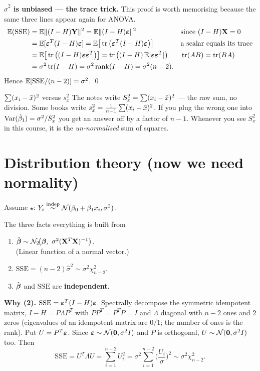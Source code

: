 \documentclass[11pt]{article}
\begin{document}
\textbf{$\hat\sigma^2$ is unbiased --- the trace trick.} This proof is worth memorising
because the same three lines appear again for ANOVA.
\begin{align*}
  \mathbb{E}(\mathrm{SSE}) &= \mathbb{E}\|(I-H)\mathbf{Y}\|^2 = \mathbb{E}\|(I-H)\boldsymbol{\varepsilon}\|^2 && \text{since } (I-H)\mathbf{X}=0\\
  &= \mathbb{E}[\boldsymbol{\varepsilon}^T(I-H)\boldsymbol{\varepsilon}] = \mathbb{E}\big[\operatorname{tr}\big(\boldsymbol{\varepsilon}^T(I-H)\boldsymbol{\varepsilon}\big)\big] && \text{a scalar equals its trace}\\
  &= \mathbb{E}\big[\operatorname{tr}\big((I-H)\boldsymbol{\varepsilon}\boldsymbol{\varepsilon}^T\big)\big] = \operatorname{tr}\big((I-H)\,\mathbb{E}[\boldsymbol{\varepsilon}\boldsymbol{\varepsilon}^T]\big) && \operatorname{tr}(AB)=\operatorname{tr}(BA)\\
  &= \sigma^2\operatorname{tr}(I-H) = \sigma^2\operatorname{rank}(I-H) = \sigma^2(n-2).
\end{align*}
Hence $\mathbb{E}[\mathrm{SSE}/(n-2)]=\sigma^2$. \qed

\begin{confusion}{$\sum(x_i-\bar{x})^2$ versus $s_x^2$}
The notes write $S_x^2=\sum(x_i-\bar{x})^2$ --- the raw sum, no division. Some books write
$s_x^2 = \frac1{n-1}\sum(x_i-\bar{x})^2$. If you plug the wrong one into
$\operatorname{Var}(\hat\beta_1)=\sigma^2/S_x^2$ you get an answer off by a factor of $n-1$. Whenever you
see $S_x^2$ in this course, it is the \emph{un-normalised} sum of squares.
\end{confusion}

\section{Distribution theory (now we need normality)}

Assume $\star$: $Y_i \overset{\text{indep}}{\sim} \mathcal{N}(\beta_0+\beta_1x_i,\sigma^2)$.

\begin{idea}{The three facts everything is built from}
\begin{enumerate}
  \item $\hat\bb \sim \N_2\!\big(\bb,\ \sigma^2(\bX^T\bX)^{-1}\big)$. \\
        (Linear function of a normal vector.)
  \item $\mathrm{SSE}=(n-2)\hat\sigma^2 \sim \sigma^2\chi^2_{n-2}$.
  \item $\hat{\boldsymbol{\beta}}$ and $\mathrm{SSE}$ are \textbf{independent}.
\end{enumerate}
\end{idea}

\textbf{Why (2).} $\mathrm{SSE}=\boldsymbol{\varepsilon}^T(I-H)\boldsymbol{\varepsilon}$. Spectrally decompose the symmetric
idempotent matrix, $I-H=P\Lambda P^T$ with $PP^T=P^TP=I$ and $\Lambda$ diagonal with
$n-2$ ones and $2$ zeros (eigenvalues of an idempotent matrix are $0/1$; the number of ones
is the rank). Put $U=P^T\boldsymbol{\varepsilon}$. Since $\boldsymbol{\varepsilon}\sim\mathcal{N}(\mathbf{0},\sigma^2 I)$ and $P$ is orthogonal,
$U\sim\mathcal{N}(\mathbf{0},\sigma^2 I)$ too. Then
\[
  \mathrm{SSE}= U^T\Lambda U = \sum_{i=1}^{n-2} U_i^2
  = \sigma^2\sum_{i=1}^{n-2}\Big(\frac{U_i}{\sigma}\Big)^2 \sim \sigma^2\chi^2_{n-2}.
\]
\end{document}

